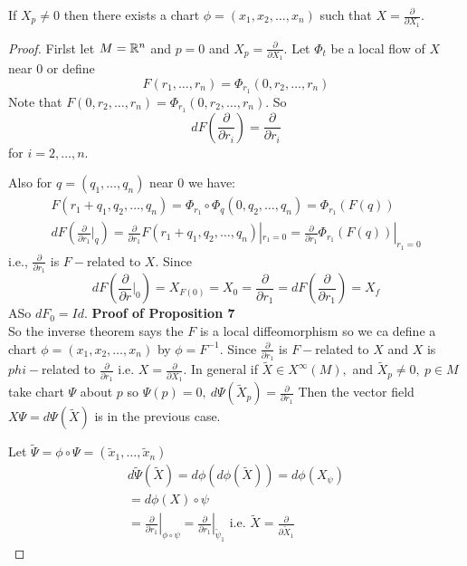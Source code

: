 \begin{teorema}
If $X_p\neq 0$ then there exists a chart $\phi=(x_1,x_2,\ldots, x_n)$ such that $X= \frac{\partial}{\partial X_1}$.
\begin{proof}
Firlst let $M=\mathbb{R}^n$ and $p=0$ and $X_p = \frac{\partial}{\partial X_1}$. Let $\Phi_t$ be a local flow of $X$ near 0 or define 
$$F(r_1,\ldots, r_n) = \Phi_{r_1} (0,r_2,\ldots, r_n)$$
Note that $F(0,r_2,\ldots,r_n) = \Phi_{r_1} (0,r_2,\ldots,r_n)$. So
$$dF\left(\frac{\partial}{\partial r_i}\right)= \frac{\partial}{\partial r_i}$$
for $i= 2,\ldots,n$.

Also for $q=(q_1,\ldots, q_n)$ near 0 we have:
\begin{gather*}
F(r_1 + q_1,q_2,\ldots,q_n) = \Phi_{r_1} \circ \Phi_q(0,q_2,\ldots,q_n) = \Phi_{r_1}(F(q))\\
dF\left(\frac{\partial}{\partial r_1} |_q \right) = \frac{\partial}{\partial r_1} F(r_1 + q_1,q_2,\ldots,q_n)|_{r_1=0} = \frac{\partial}{\partial r_1} \Phi_{r_1} (F(q)) | _{r_1=0}
\end{gather*}
i.e., $ \frac{\partial}{\partial r_1}$ is $F-$related to $X$. Since
$$dF\left( \frac{\partial}{\partial r}|_0\right) = X_{F(0)} = X_0 = \frac{\partial}{\partial r_1} = dF\left(\frac{\partial}{\partial r_1} \right) = X_f$$
ASo $dF_0 = Id$.
\textbf{Proof of Proposition 7}\\
So the inverse theorem says the $F$ is a local diffeomorphism so we ca define a chart $\phi=(x_1,x_2,\ldots,x_n)$ by $\phi=F^{-1}$. Since $\frac{\partial}{\partial r_1}$ is $F-$related 
to $X$ and $X$ is $phi-$related to $\frac{\partial}{\partial r_1}$ i.e. $X=\frac{\partial}{\partial X_1}$. 
In general if $\tilde X \in X^\infty(M),$ and $\tilde X_p\neq 0,\ p\in M$ take chart $\Psi$ about $p$ so $\Psi(p)=0,\ d\Psi(\tilde X_p) = \frac{\partial}{\partial r_1}$ 
Then the vector field $X\Psi = d\Psi(\tilde X)$ is in the previous case.

Let $\tilde \Psi= \phi\circ \Psi = (\tilde x_1,\ldots, \tilde x_n)$
\begin{gather*}
    d\tilde \Psi(\tilde X) = d\phi(d\phi(\tilde X)) = d\phi(X_\psi) \\
    = d\phi(X) \circ \psi\\
    = \left.\frac{\partial}{\partial r_1}\right|_{\phi\circ \psi} =\left. \frac{\partial}{\partial r_1}\right|_{\tilde \psi_1} \text{  i.e. } \tilde X = \frac{\partial}{\partial \tilde X_1}
\end{gather*}
\end{proof}
\end{teorema}

